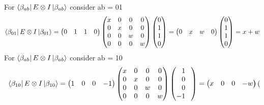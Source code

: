 \documentclass[a4paper,12pt]{article}
\begin{document}
\begin{enumerate}[label=(\alph*)]
    For $\bra{\beta_{ab}}E \otimes I \ket{\beta_{ab}}$ consider ab = 01
    \[\bra{\beta_{01}}E \otimes I \ket{\beta_{01}} = \begin{pmatrix}
        0 & 1 & 1 & 0
    \end{pmatrix} \begin{pmatrix}
        x & 0 & 0 & 0 \\
        0 & x & 0 & 0 \\
        0 & 0 & w & 0 \\
        0 & 0 & 0 & w \\
    \end{pmatrix} \begin{pmatrix}
        0 \\
        1 \\
        1 \\
        0 \\
    \end{pmatrix} = \begin{pmatrix}
        0 & x & w & 0
    \end{pmatrix} \begin{pmatrix}
        0 \\
        1 \\
        1 \\
        0 \\
    \end{pmatrix} = x + w\] 
    For $\bra{\beta_{ab}}E \otimes I \ket{\beta_{ab}}$ consider ab = 10
    \[\bra{\beta_{10}}E \otimes I \ket{\beta_{10}} = \begin{pmatrix}
        1 & 0 & 0 & -1
    \end{pmatrix} \begin{pmatrix}
        x & 0 & 0 & 0 \\
        0 & x & 0 & 0 \\
        0 & 0 & w & 0 \\
        0 & 0 & 0 & w \\
    \end{pmatrix} \begin{pmatrix}
        \phantom{-}1\phantom{-} \\
        \phantom{-}0\phantom{-} \\
        \phantom{-}0\phantom{-} \\
        -1\phantom{-} \\
    \end{pmatrix} = \begin{pmatrix}
        x & 0 & 0 & -w
    \end{pmatrix} \begin{pmatrix}

\end{pmatrix}\]
\end{enumerate}
\end{document}
